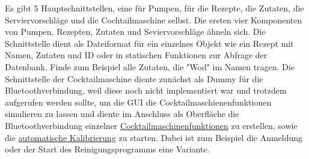 Es gibt 5 Hauptschnittstellen, eine für Pumpen, für die Rezepte, die Zutaten, die Serviervorschläge und die Cochtailmaschine selbst. 
Die ersten vier Komponenten von Pumpen, Rezepten, Zutaten und Seviervorschläge ähneln sich. Die Schnittstelle dient als Dateiformat für ein einzelnes Objekt wie ein Rezept mit Namen, Zutaten und ID oder in statischen Funktionen zur Abfrage der Datenbank. Finde zum Beispiel alle Zutaten, die "Wod" im Namen tragen. Die Schnittstelle der Cocktailmaschine diente zunächst als Dummy für die Bluetoothverbindung, weil diese noch nicht implementiert war und trotzdem aufgerufen werden sollte, um die GUI die Cocktailmaschienenfunktionen simulieren zu lassen und diente im Anschluss als Oberfläche die Bluetoothverbindung einzelner \hyperref[sec:espbefehle]{Cocktailmaschinenfunktionen} zu erstellen, sowie die \hyperref[sec:dioautokal]{automatische Kalibrierung} zu starten. Dabei ist zum Beispiel die Anmeldung oder der Start des Reinigungsprogramms eine Variante.
